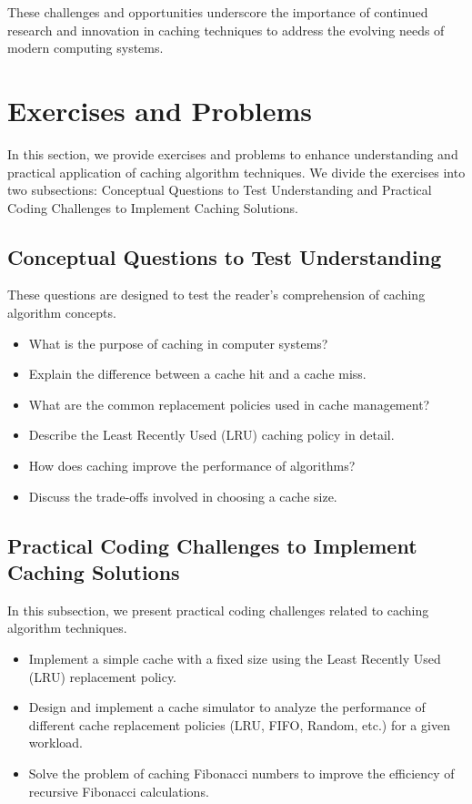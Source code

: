 \documentclass[12pt]{book} %
\begin{document}
These challenges and opportunities underscore the importance of continued research and innovation in caching techniques to address the evolving needs of modern computing systems.


\section{Exercises and Problems}
In this section, we provide exercises and problems to enhance understanding and practical application of caching algorithm techniques. We divide the exercises into two subsections: Conceptual Questions to Test Understanding and Practical Coding Challenges to Implement Caching Solutions.

\subsection{Conceptual Questions to Test Understanding}
These questions are designed to test the reader's comprehension of caching algorithm concepts.

\begin{itemize}
    \item What is the purpose of caching in computer systems?
    \item Explain the difference between a cache hit and a cache miss.
    \item What are the common replacement policies used in cache management?
    \item Describe the Least Recently Used (LRU) caching policy in detail.
    \item How does caching improve the performance of algorithms?
    \item Discuss the trade-offs involved in choosing a cache size.
\end{itemize}

\subsection{Practical Coding Challenges to Implement Caching Solutions}
In this subsection, we present practical coding challenges related to caching algorithm techniques.

\begin{itemize}
    \item Implement a simple cache with a fixed size using the Least Recently Used (LRU) replacement policy.
    \item Design and implement a cache simulator to analyze the performance of different cache replacement policies (LRU, FIFO, Random, etc.) for a given workload.
    \item Solve the problem of caching Fibonacci numbers to improve the efficiency of recursive Fibonacci calculations.
\end{itemize}
\end{document}
